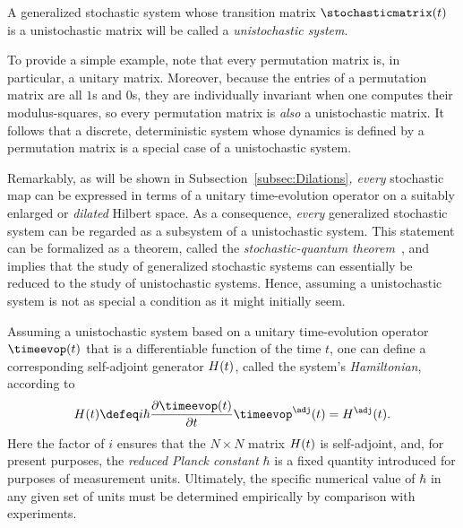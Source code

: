 \documentclass[12pt,english,prl,superscriptaddress,nobibnotes,nofootinbib]{revtex4-2}
\let\originalleft\left
\let\originalright\right
\renewcommand{\left}{\mathopen{}\mathclose\bgroup\originalleft}
\renewcommand{\right}{\aftergroup\egroup\originalright}
\begin{document}
A generalized stochastic system whose transition matrix $\stochasticmatrix\left(t\right)$
is a unistochastic matrix will be called a \emph{unistochastic system}.

To provide a simple example, note that every permutation matrix is,
in particular, a unitary matrix. Moreover, because the entries of
a permutation matrix are all $1$s and $0$s, they are individually
invariant when one computes their modulus-squares, so every permutation
matrix is \emph{also} a unistochastic matrix. It follows that a discrete,
deterministic system whose dynamics is defined by a permutation matrix
is a special case of a unistochastic system. 

Remarkably, as will be shown in Subsection~\ref{subsec:Dilations}\emph{,
every} stochastic map can be expressed in terms of a unitary time-evolution
operator on a suitably enlarged or \emph{dilated} Hilbert space.
As a consequence, \emph{every} generalized stochastic system can be
regarded as a subsystem of a unistochastic system. This statement
can be formalized as a theorem, called the \emph{stochastic-quantum theorem}~\citep{Barandes:2023tsqt},
and implies that the study of generalized stochastic systems can essentially
be reduced to the study of unistochastic systems. Hence, assuming
a unistochastic system is not as special a condition as it might initially
seem.

Assuming a unistochastic system based on a unitary time-evolution
operator $\timeevop\left(t\right)$ that is a differentiable function
of the time $t$, one can define a corresponding self-adjoint generator
$H\left(t\right)$, called the system's \emph{Hamiltonian}, according
to 
\begin{equation}
H\left(t\right)\defeq i\hbar\frac{\partial\timeevop\left(t\right)}{\partial t}\timeevop^{\adj}\left(t\right)=H^{\adj}\left(t\right).\label{eq:DefHamiltonian}
\end{equation}
 Here the factor of $i$ ensures that the $N\times N$ matrix $H\left(t\right)$
is self-adjoint, and, for present purposes, the \emph{reduced Planck constant}
$\hbar$ is a fixed quantity introduced for purposes of measurement
units. Ultimately, the specific numerical value of $\hbar$ in any
given set of units must be determined empirically by comparison with
experiments.
\end{document}
